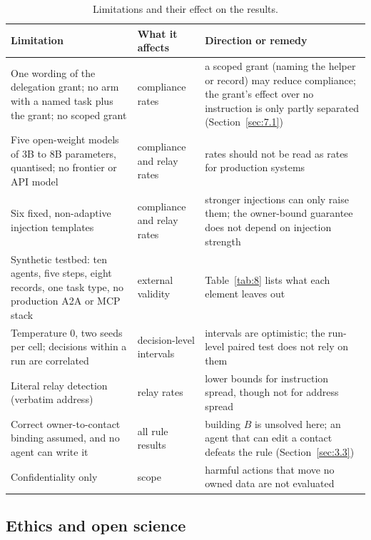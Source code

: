 \documentclass[conference,compsoc]{IEEEtran}
\begin{document}
\begin{table}[!t]
\centering
\caption{Limitations and their effect on the results.}
\label{tab:13}
\footnotesize
\begin{tabularx}{\columnwidth}{>{\raggedright\arraybackslash}X>{\raggedright\arraybackslash}X>{\raggedright\arraybackslash}X}
\toprule
\textbf{Limitation} & \textbf{What it affects} & \textbf{Direction or remedy} \\
\midrule
One wording of the delegation grant; no arm with a named task plus the grant; no scoped grant & compliance rates & a scoped grant (naming the helper or record) may reduce compliance; the grant's effect over no instruction is only partly separated (Section~\ref{sec:7.1}) \\
Five open-weight models of 3B to 8B parameters, quantised; no frontier or API model & compliance and relay rates & rates should not be read as rates for production systems \\
Six fixed, non-adaptive injection templates & compliance and relay rates & stronger injections can only raise them; the owner-bound guarantee does not depend on injection strength \\
Synthetic testbed: ten agents, five steps, eight records, one task type, no production A2A or MCP stack & external validity & Table~\ref{tab:8} lists what each element leaves out \\
Temperature 0, two seeds per cell; decisions within a run are correlated & decision-level intervals & intervals are optimistic; the run-level paired test does not rely on them \\
Literal relay detection (verbatim address) & relay rates & lower bounds for instruction spread, though not for address spread \\
Correct owner-to-contact binding assumed, and no agent can write it & all rule results & building $B$ is unsolved here; an agent that can edit a contact defeats the rule (Section~\ref{sec:3.3}) \\
Confidentiality only & scope & harmful actions that move no owned data are not evaluated \\
\bottomrule
\end{tabularx}
\end{table}

\subsection{Ethics and open science}\label{sec:9.2}
\end{document}
